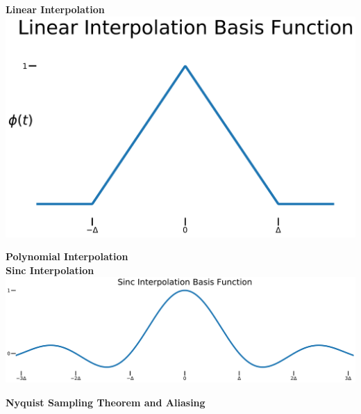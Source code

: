\textbf{Linear Interpolation} \\
\includegraphics[width=\textwidth]{figures/lin_basis}


\textbf{Polynomial Interpolation} \\

\textbf{Sinc Interpolation} \\
\includegraphics[width=\textwidth]{figures/sinc_basis}





\textbf{Nyquist Sampling Theorem and Aliasing} \\


